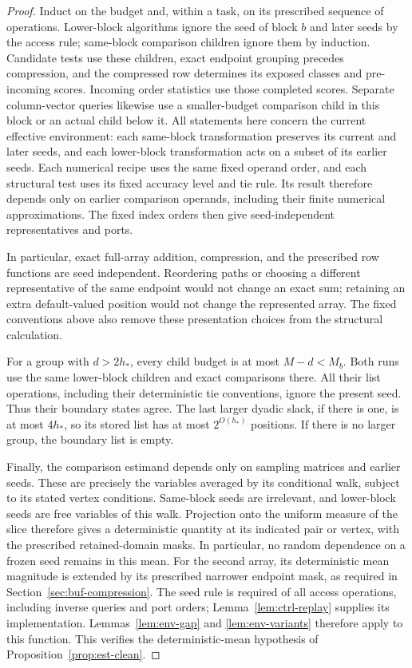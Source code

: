 \begin{proof}
Induct on the budget and, within a task, on its prescribed sequence of
operations.  Lower-block algorithms ignore the seed of block $b$ and
later seeds by the access rule; same-block comparison children ignore them
by induction.  Candidate tests use these children, exact endpoint
grouping precedes compression, and the compressed row determines its
exposed classes and pre-incoming scores.  Incoming order statistics use those
completed scores.  Separate column-vector queries likewise use a
smaller-budget comparison child in this block or an actual child below it.
All statements here concern the current effective environment: each
same-block transformation preserves its current and later seeds, and
each lower-block transformation acts on a subset of its earlier seeds.
Each numerical recipe uses the same fixed operand
order, and each structural test uses its fixed accuracy level and tie
rule.  Its result therefore depends only on earlier comparison operands,
including their finite numerical approximations.  The fixed index
orders then give seed-independent representatives and ports.

In particular, exact full-array addition, compression, and the prescribed
row functions are seed independent.  Reordering paths or choosing a
different representative of the same endpoint would not change an exact
sum; retaining an extra default-valued position would not change the
represented array.  The fixed conventions above also remove these
presentation choices from the structural calculation.

For a group with $d>2h_*$, every child budget is at most $M-d<M_b$.
Both runs use the same lower-block children and exact comparisons there.
All their list operations, including their deterministic tie conventions,
ignore the present seed.  Thus their boundary states agree.  The last
larger dyadic slack, if there is one, is at most $4h_*$, so its stored list
has at most $2^{O(h_*)}$ positions.  If there is no larger group, the
boundary list is empty.

Finally, the comparison estimand depends only on sampling matrices and earlier
seeds.  These are precisely the variables averaged by its conditional
walk, subject to its stated vertex conditions.  Same-block seeds are
irrelevant, and lower-block seeds are free variables of this walk.
Projection onto the uniform measure of the slice therefore gives a
deterministic quantity at its indicated pair or vertex, with the
prescribed retained-domain masks.  In particular, no random dependence
on a frozen seed remains in this mean.  For the second array, its
deterministic mean magnitude is extended by its prescribed narrower
endpoint mask, as required in Section~\ref{sec:buf-compression}.
The seed rule is required of all access operations, including inverse
queries and port orders; Lemma~\ref{lem:ctrl-replay} supplies its
implementation.  Lemmas~\ref{lem:env-gap} and \ref{lem:env-variants}
therefore apply to this function.  This verifies the deterministic-mean
hypothesis of Proposition~\ref{prop:est-clean}.
\end{proof}

